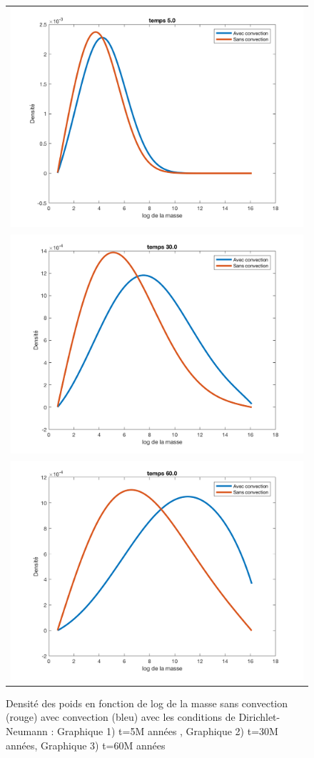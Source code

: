 \documentclass[fleqn,10pt]{SelfArx}
\begin{document}
\begin{figure}[h]
\centering
  \begin{tabular}{c}
    \includegraphics[width=.23\textwidth]{FIG_SC_AC_DN5_0.png} \\
    \includegraphics[width=.23\textwidth]{FIG_SC_AC_DN30_0.png} \\
    \includegraphics[width=.23\textwidth]{FIG_SC_AC_DN60_0.png} \\ 
  \end{tabular}
  \caption{Densité des poids en fonction de log de la masse sans convection (rouge) avec convection (bleu) avec les conditions de Dirichlet-Neumann : Graphique 1) t=5M années , Graphique 2) t=30M années,  Graphique 3) t=60M années }
 \end{figure}
\end{document}
